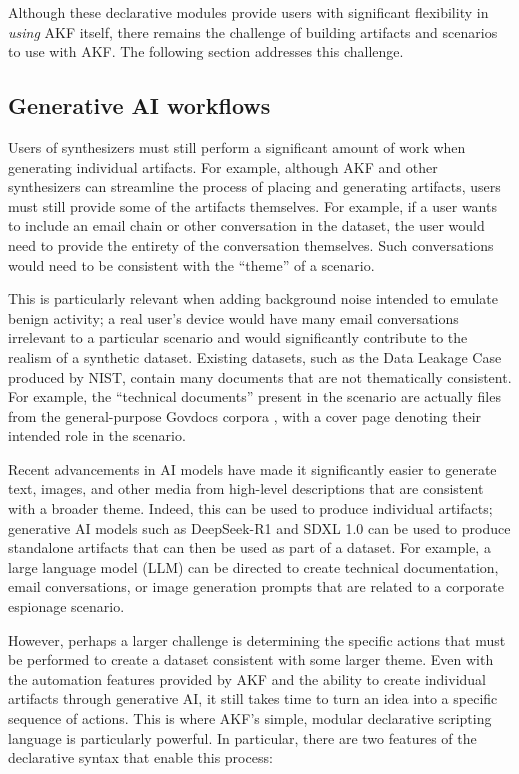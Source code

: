 \documentclass[preprint,12pt]{elsarticle}
\begin{document}
Although these declarative modules provide users with significant
flexibility in \emph{using} AKF itself, there remains the challenge of
building artifacts and scenarios to use with AKF. The following section
addresses this challenge.

\subsection{Generative AI workflows}\label{generative-ai-workflows}

Users of synthesizers must still perform a significant amount of work
when generating individual artifacts. For example, although AKF and
other synthesizers can streamline the process of placing and generating
artifacts, users must still provide some of the artifacts themselves.
For example, if a user wants to include an email chain or other
conversation in the dataset, the user would need to provide the entirety
of the conversation themselves. Such conversations would need to be
consistent with the ``theme'' of a scenario.

This is particularly relevant when adding background noise intended to
emulate benign activity; a real user's device would have many email
conversations irrelevant to a particular scenario and would
significantly contribute to the realism of a synthetic dataset. Existing
datasets, such as the Data Leakage Case produced by NIST, contain many
documents that are not thematically consistent. For example, the
``technical documents'' present in the scenario are actually files from
the general-purpose Govdocs corpora
\citep{garfinkelBringingScienceDigital2009}, with a cover page
denoting their intended role in the scenario.

Recent advancements in AI models have made it significantly easier to
generate text, images, and other media from high-level descriptions that
are consistent with a broader theme. Indeed, this can be used to produce
individual artifacts; generative AI models such as DeepSeek-R1
\citep{deepseek-aiDeepSeekR1IncentivizingReasoning2025} and SDXL 1.0
\citep{podellSDXLImprovingLatent2023} can be used to produce
standalone artifacts that can then be used as part of a dataset. For
example, a large language model (LLM) can be directed to create
technical documentation, email conversations, or image generation
prompts that are related to a corporate espionage scenario.

However, perhaps a larger challenge is determining the specific actions
that must be performed to create a dataset consistent with some larger
theme. Even with the automation features provided by AKF and the ability
to create individual artifacts through generative AI, it still takes
time to turn an idea into a specific sequence of actions. This is where
AKF's simple, modular declarative scripting language is particularly
powerful. In particular, there are two features of the declarative
syntax that enable this process:
\end{document}
